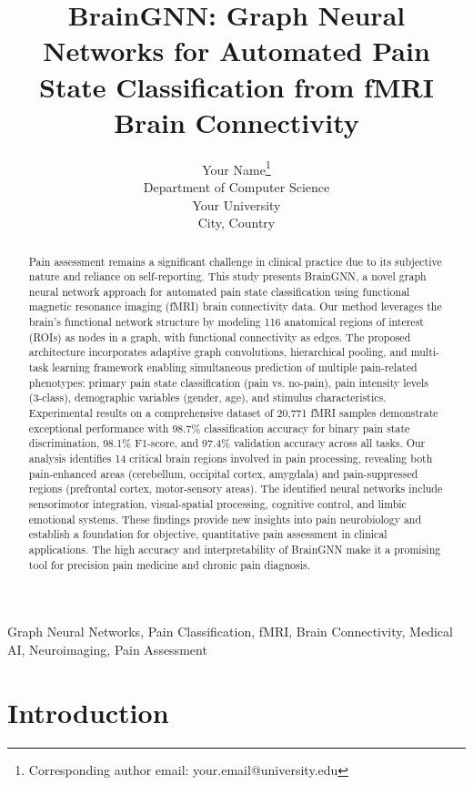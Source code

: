 \documentclass[10pt,journal,compsoc]{IEEEtran}
\title{BrainGNN: Graph Neural Networks for Automated Pain State Classification from fMRI Brain Connectivity}
\author{
    Your Name\thanks{Corresponding author email: your.email@university.edu}\\
    Department of Computer Science\\
    Your University\\
    City, Country
}
\begin{document}
\maketitle

\begin{abstract}
Pain assessment remains a significant challenge in clinical practice due to its subjective nature and reliance on self-reporting. This study presents BrainGNN, a novel graph neural network approach for automated pain state classification using functional magnetic resonance imaging (fMRI) brain connectivity data. Our method leverages the brain's functional network structure by modeling 116 anatomical regions of interest (ROIs) as nodes in a graph, with functional connectivity as edges. The proposed architecture incorporates adaptive graph convolutions, hierarchical pooling, and multi-task learning framework enabling simultaneous prediction of multiple pain-related phenotypes: primary pain state classification (pain vs. no-pain), pain intensity levels (3-class), demographic variables (gender, age), and stimulus characteristics. Experimental results on a comprehensive dataset of 20,771 fMRI samples demonstrate exceptional performance with 98.7\% classification accuracy for binary pain state discrimination, 98.1\% F1-score, and 97.4\% validation accuracy across all tasks. Our analysis identifies 14 critical brain regions involved in pain processing, revealing both pain-enhanced areas (cerebellum, occipital cortex, amygdala) and pain-suppressed regions (prefrontal cortex, motor-sensory areas). The identified neural networks include sensorimotor integration, visual-spatial processing, cognitive control, and limbic emotional systems. These findings provide new insights into pain neurobiology and establish a foundation for objective, quantitative pain assessment in clinical applications. The high accuracy and interpretability of BrainGNN make it a promising tool for precision pain medicine and chronic pain diagnosis.
\end{abstract}

\begin{IEEEkeywords}
Graph Neural Networks, Pain Classification, fMRI, Brain Connectivity, Medical AI, Neuroimaging, Pain Assessment
\end{IEEEkeywords}

\section{Introduction}
\end{document}

